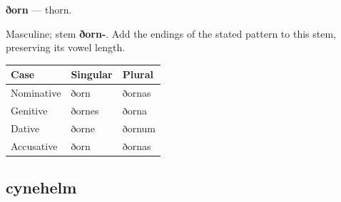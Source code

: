 \par\begin{minipage}{\linewidth}\raggedright
\textbf{ðorn} — thorn.

Masculine; stem \textbf{ðorn-}. Add the endings of the stated pattern to this stem, preserving its vowel length.

\par\begingroup
\fontsize{10.5}{13.2}\selectfont
\setlength{\LTleft}{0pt}\setlength{\LTright}{\fill}
\noindent
\begin{tabular}{@{}>{\raggedright\arraybackslash}p{39.46mm}>{\raggedright\arraybackslash}p{39.46mm}>{\raggedright\arraybackslash}p{39.46mm}@{}}
\toprule
\textbf{Case} & \textbf{Singular} & \textbf{Plural} \\
\midrule
Nominative & ðorn & ðornas \\
Genitive & ðornes & ðorna \\
Dative & ðorne & ðornum \\
Accusative & ðorn & ðornas \\
\bottomrule
\end{tabular}
\par\endgroup

\end{minipage}\par
{}
\subsection*{cynehelm}

